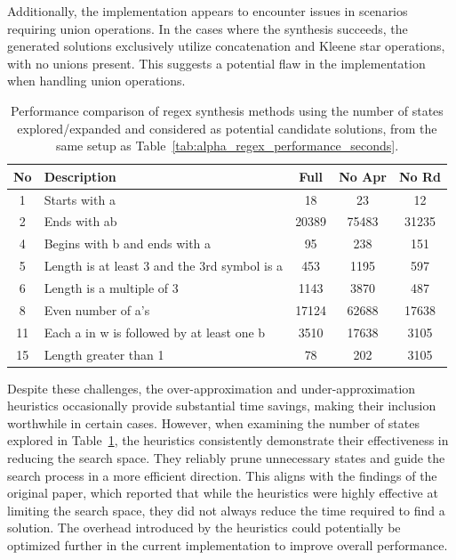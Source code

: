 \indent\indent Additionally, the implementation appears to encounter issues in scenarios requiring union operations. In the cases where the synthesis succeeds, the generated solutions exclusively utilize concatenation and Kleene star operations, with no unions present. This suggests a potential flaw in the implementation when handling union operations.

\begin{table}[h!]
	\centering
	\caption{Performance comparison of regex synthesis methods using the number of states explored/expanded and considered as potential candidate solutions, from the same setup as Table~\ref{tab:alpha_regex_performance_seconds}.}
	\label{tab:alpha_regex_performance_states}
	\begin{tabular}{|c|p{5cm}|c|c|c|}
	\hline
	\textbf{No} & \textbf{Description} & \textbf{Full} & \textbf{No Apr} & \textbf{No Rd} \\
	\hline
	1 & Starts with a & 18 & 23 & 12 \\
	2 & Ends with ab & 20389 & 75483 & 31235 \\
	4 & Begins with b and ends with a & 95 & 238 & 151 \\
	5 & Length is at least 3 and the 3rd symbol is a & 453 & 1195 & 597 \\
	6 & Length is a multiple of 3 & 1143 & 3870 & 487 \\
	8 & Even number of a's & 17124 & 62688 & 17638 \\
	11 & Each a in w is followed by at least one b & 3510 & 17638 & 3105 \\
	15 & Length greater than 1 & 78 & 202 & 3105 \\
	\hline
\end{tabular}
\end{table}

\indent\indent Despite these challenges, the over-approximation and under-approximation heuristics occasionally provide substantial time savings, making their inclusion worthwhile in certain cases. However, when examining the number of states explored in Table~\ref{tab:alpha_regex_performance_states}, the heuristics consistently demonstrate their effectiveness in reducing the search space. They reliably prune unnecessary states and guide the search process in a more efficient direction. This aligns with the findings of the original paper, which reported that while the heuristics were highly effective at limiting the search space, they did not always reduce the time required to find a solution. The overhead introduced by the heuristics could potentially be optimized further in the current implementation to improve overall performance.


